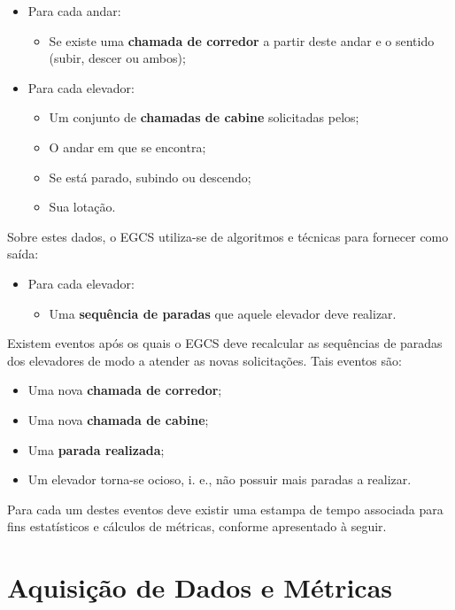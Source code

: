 \begin{itemize}
  \item Para cada andar:
  \begin{itemize}
    \item Se existe uma \textbf{chamada de corredor} a partir deste andar e o sentido (subir, descer ou ambos);
  \end{itemize}
  \item Para cada elevador:
  \begin{itemize}
    \item Um conjunto de \textbf{chamadas de cabine} solicitadas pelos;
    \item O andar em que se encontra;
    \item Se está parado, subindo ou descendo;
    \item Sua lotação.
  \end{itemize}
\end{itemize}

Sobre estes dados, o EGCS utiliza-se de algoritmos e técnicas para fornecer como saída:

\begin{itemize}
  \item Para cada elevador:
  \begin{itemize}
    \item Uma \textbf{sequência de paradas} que aquele elevador deve realizar.
  \end{itemize}
\end{itemize}

Existem eventos após os quais o EGCS deve recalcular as sequências de paradas dos elevadores de modo a atender as novas solicitações. Tais eventos são:

\begin{itemize}
  \item Uma nova \textbf{chamada de corredor};
  \item Uma nova \textbf{chamada de cabine};
  \item Uma \textbf{parada realizada};
  \item Um elevador torna-se ocioso, i. e., não possuir mais paradas a realizar.
\end{itemize}

Para cada um destes eventos deve existir uma estampa de tempo associada para fins estatísticos e cálculos de métricas, conforme apresentado à seguir.

\section{Aquisição de Dados e Métricas}


